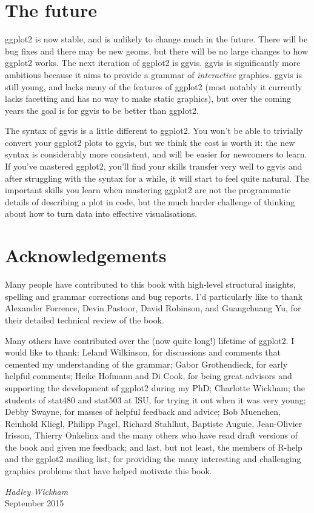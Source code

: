 \section*{The future}

ggplot2 is now stable, and is unlikely to change much in the future.
There will be bug fixes and there may be new geoms, but there will be no
large changes to how ggplot2 works. The next iteration of ggplot2 is
ggvis. ggvis is significantly more ambitious because it aims to provide
a grammar of \emph{interactive} graphics. ggvis is still young, and
lacks many of the features of ggplot2 (most notably it currently lacks
facetting and has no way to make static graphics), but over the coming
years the goal is for ggvis to be better than ggplot2.

The syntax of ggvis is a little different to ggplot2. You won't be able
to trivially convert your ggplot2 plots to ggvis, but we think the cost
is worth it: the new syntax is considerably more consistent, and will be
easier for newcomers to learn. If you've mastered ggplot2, you'll find
your skills transfer very well to ggvis and after struggling with the
syntax for a while, it will start to feel quite natural. The important
skills you learn when mastering ggplot2 are not the programmatic details
of describing a plot in code, but the much harder challenge of thinking
about how to turn data into effective visualisations.

\section*{Acknowledgements}

Many people have contributed to this book with high-level structural
insights, spelling and grammar corrections and bug reports. I'd
particularly like to thank Alexander Forrence, Devin Pastoor, David
Robinson, and Guangchuang Yu, for their detailed technical review of the
book.

Many others have contributed over the (now quite long!) lifetime of
ggplot2. I would like to thank: Leland Wilkinson, for discussions and
comments that cemented my understanding of the grammar; Gabor
Grothendieck, for early helpful comments; Heike Hofmann and Di Cook, for
being great advisors and supporting the development of ggplot2 during my
PhD; Charlotte Wickham; the students of stat480 and stat503 at ISU, for
trying it out when it was very young; Debby Swayne, for masses of
helpful feedback and advice; Bob Muenchen, Reinhold Kliegl, Philipp
Pagel, Richard Stahlhut, Baptiste Auguie, Jean-Olivier Irisson, Thierry
Onkelinx and the many others who have read draft versions of the book
and given me feedback; and last, but not least, the members of R-help
and the ggplot2 mailing list, for providing the many interesting and
challenging graphics problems that have helped motivate this book.

\vspace{\baselineskip}\begin{flushright}\noindent
{\it Hadley Wickham}\\
September 2015\\
\end{flushright}

